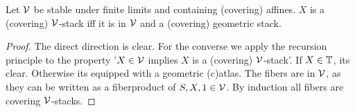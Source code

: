 \documentclass{article}
\begin{document}
\begin{prop}{\label{prop:coveringVstackDescr}}
	Let $\mathcal{V}$ be stable under finite limits and containing (covering) affines. $X$ is a (covering) $\mathcal{V}$-stack iff it is in $\mathcal{V}$ and a (covering) geometric stack.
\end{prop}
\begin{proof} 	
	The direct direction is clear. For the converse we apply the recursion principle to the property '$X \in \mathcal{V}$ implies $X$ is a (covering) $\mathcal{V}$-stack'. If $X \in \mathbb{T}$, its clear. Otherwise its equipped with a geometric (c)atlas. The fibers are in $\mathcal{V}$, as they can be written as a fiberproduct of $S, X, 1 \in \mathcal{V}$.  By induction all fibers are covering $\mathcal{V}$-stacks. %
\end{proof}
\end{document}
